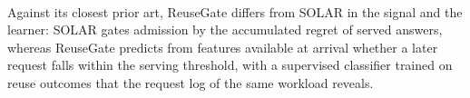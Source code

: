 \\
Against its closest prior art, ReuseGate differs from SOLAR in the signal and the learner: SOLAR gates admission by the accumulated regret of served answers, whereas ReuseGate predicts from features available at arrival whether a later request falls within the serving threshold, with a supervised classifier trained on reuse outcomes that the request log of the same workload reveals.

